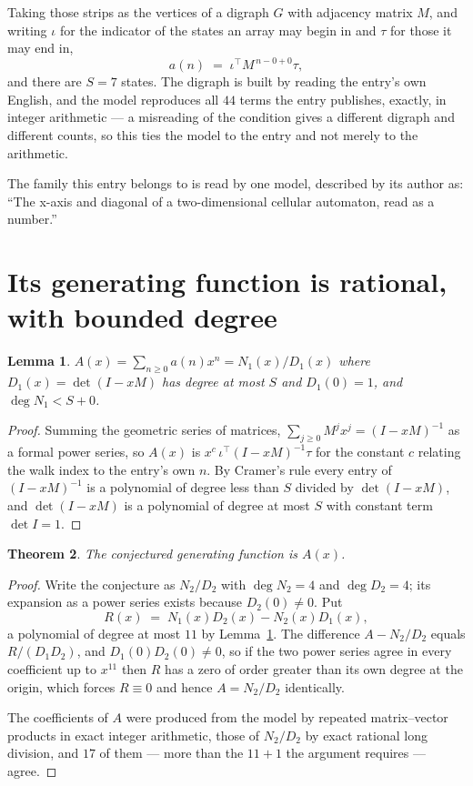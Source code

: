 \documentclass[11pt,a4paper]{article}
\theoremstyle{plain}
\newtheorem{theorem}{Theorem}
\newtheorem{lemma}[theorem]{Lemma}
\theoremstyle{definition}
\begin{document}
Taking those strips as the vertices of a digraph $G$ with adjacency matrix $M$, and writing
$\iota$ for the indicator of the states an array may begin in and $\tau$ for those it may end
in,
\[
a(n)\;=\;\iota^{\!\top}M^{\,n-0+0}\tau ,
\]
and there are $S=7$ states. The digraph is built by reading the entry's own English, and the
model reproduces all $44$ terms the entry publishes, exactly, in integer arithmetic --- a
misreading of the condition gives a different digraph and different counts, so this ties the
model to the entry and not merely to the arithmetic.

The family this entry belongs to is read by one model, described by its author as: ``The x-axis and diagonal of a two-dimensional cellular automaton, read as a number.''


\section{Its generating function is rational, with bounded degree}

\begin{lemma}\label{lem:rat}
$A(x)=\sum_{n\ge0}a(n)x^n=N_1(x)/D_1(x)$ where $D_1(x)=\det(I-xM)$ has degree at most
$S$ and $D_1(0)=1$, and $\deg N_1<S+0$.
\end{lemma}

\begin{proof}
Summing the geometric series of matrices, $\sum_{j\ge0}M^jx^j=(I-xM)^{-1}$ as a formal
power series, so $A(x)$ is $x^{c}\,\iota^{\!\top}(I-xM)^{-1}\tau$ for the constant $c$
relating the walk index to the entry's own $n$. By Cramer's rule every entry of
$(I-xM)^{-1}$ is a polynomial of degree less than $S$ divided by $\det(I-xM)$, and
$\det(I-xM)$ is a polynomial of degree at most $S$ with constant term $\det I=1$.
\end{proof}

\begin{theorem}
The conjectured generating function is $A(x)$.
\end{theorem}

\begin{proof}
Write the conjecture as $N_2/D_2$ with $\deg N_2=4$ and $\deg D_2=4$; its expansion as a
power series exists because $D_2(0)\neq0$. Put
\[
R(x)\;=\;N_1(x)D_2(x)-N_2(x)D_1(x),
\]
a polynomial of degree at most $11$ by Lemma~\ref{lem:rat}. The difference
$A-N_2/D_2$ equals $R/(D_1D_2)$, and $D_1(0)D_2(0)\neq0$, so if the two power series agree in
every coefficient up to $x^{11}$ then $R$ has a zero of order greater than its own
degree at the origin, which forces $R\equiv0$ and hence $A=N_2/D_2$ identically.

The coefficients of $A$ were produced from the model by repeated matrix--vector products in
exact integer arithmetic, those of $N_2/D_2$ by exact rational long division, and $17$
of them --- more than the $11+1$ the argument requires --- agree.
\end{proof}
\end{document}
